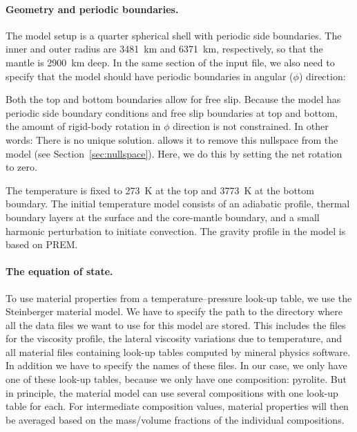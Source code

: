 \paragraph{Geometry and periodic boundaries.}
The model setup is a quarter spherical shell with periodic side boundaries. The inner and outer radius are 3481~km and 6371~km, respectively, so that the mantle is 2900~km deep. In the same section of the input file, we also need to specify that the model should have periodic boundaries in angular ($\phi$) direction:  

Both the top and bottom boundaries allow for free slip. Because the model has periodic side boundary conditions and free slip boundaries at top and bottom, the amount of rigid-body rotation in $\phi$ direction is not constrained. In other words: There is no unique solution. \aspect{} allows it to remove this nullspace from the model (see Section~\ref{sec:nullspace}). Here, we do this by setting the net rotation to zero. 

The temperature is fixed to 273~K at the top and 3773~K at the bottom boundary. 
The initial temperature model consists of an adiabatic profile,
thermal boundary layers at the surface and the core-mantle boundary, 
and a small harmonic perturbation to initiate convection.
The gravity profile in the model is based on PREM. 

\paragraph{The equation of state.}
To use material properties from a temperature--pressure look-up table, we use the Steinberger material model. We have to specify the path to the directory where all the data files we want to use for this model are stored. This includes the files for the viscosity profile, the lateral viscosity variations due to temperature, and all material files containing look-up tables computed by mineral physics software.
In addition we have to specify the names of these files. 
In our case, we only have one of these look-up tables, because we only have one composition: pyrolite. 
But in principle, the material model can use several compositions with one look-up table for each. 
For intermediate composition values, material properties will then be averaged based on the mass/volume fractions of the individual compositions. 

